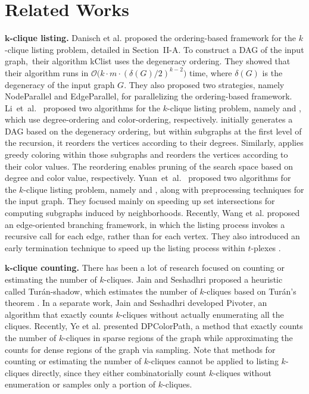 \section{Related Works}
\noindent
\textbf{$\bm{k}$-clique listing.}
Danisch et al. \cite{kClist} proposed the ordering-based framework for the $k$-clique listing problem, detailed in Section~II-A.
To construct a DAG of the input graph,~their algorithm \textsf{kClist} uses the degeneracy ordering.
They showed that their algorithm runs in $\mathcal{O}\big(k\cdot m\cdot (\delta(G)/2)^{k-2} \big)$ time, where $\delta(G)$ is the degeneracy of the input graph $G$.
They also proposed two strategies, namely \textsf{NodeParallel} and \textsf{EdgeParallel}, for parallelizing the ordering-based framework.
Li~et~al.~\cite{OrderingHeuristics} proposed two algorithms for the $k$-clique listing problem, namely \DDegree and \DDegCol, which use degree-ordering and color-ordering, respectively.
\DDegree initially generates a DAG based on the degeneracy ordering, but within subgraphs at the first level of the recursion, it reorders the vertices according to their degrees.
Similarly, \DDegCol applies greedy coloring within those subgraphs and reorders the vertices according to their color values.
The reordering enables pruning of the search space based on degree and color value, respectively.
Yuan~et~al.~\cite{SetIntersectionSpeedup} proposed two algorithms for the $k$-clique listing problem, namely \SDegree and \BitCol, along with preprocessing techniques for the input graph.
They focused mainly on speeding up set intersections for computing subgraphs induced by neighborhoods.
Recently, Wang et al. \cite{EBBkC} proposed an edge-oriented branching framework, in which the listing process invokes a recursive call for each edge, rather than for each vertex.
They also introduced an early termination technique to speed up the listing process within $t$-plexes \cite{plex}.

\noindent
\textbf{$\bm{k}$-clique counting.}
There has been a lot of research focused on counting or estimating the number of $k$-cliques.
Jain and Seshadhri \cite{jain2017fast} proposed a heuristic called \textsf{Tur{\'a}n-shadow}, which estimates the number of $k$-cliques based on Tur{\'a}n's theorem \cite{turan1941external}.
In a separate work, Jain and Seshadhri \cite{jain2020power} developed \textsf{Pivoter}, an algorithm that exactly counts $k$-cliques without actually enumerating all the cliques.
Recently, Ye et al. \cite{ye2022lightning} presented \textsf{DPColorPath}, a method that exactly counts the number of $k$-cliques in sparse regions of the graph while approximating the counts for dense regions of the graph via sampling. 
Note that methods for counting or estimating the number of $k$-cliques cannot be applied to listing $k$-cliques directly, since they either combinatorially count $k$-cliques without enumeration or samples only a portion of $k$-cliques.

